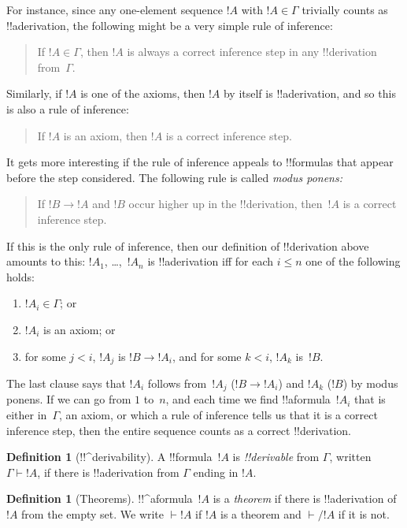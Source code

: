 \documentclass[10pt,a4paper]{article}
\theoremstyle{plain}
\theoremstyle{definition}
\newtheorem{defn}[thm]{Definition}
\theoremstyle{remark}
\providecommand{\lif}{\mathbin{\rightarrow}}
\providecommand{\Proves}{\mathrel{\vdash}}
\begin{document}
For instance, since any one-element sequence $!A$ with $!A \in \Gamma$
trivially counts as !!a{derivation}, the following might be a very
simple rule of inference:
\begin{quote}
  If $!A \in \Gamma$, then $!A$ is always a correct inference step in
  any !!{derivation} from~$\Gamma$.
\end{quote}
Similarly, if $!A$ is one of the axioms, then $!A$ by itself is
!!a{derivation}, and so this is also a rule of inference:
\begin{quote}
  If $!A$ is an axiom, then $!A$ is a correct inference step.
\end{quote}
It gets more interesting if the rule of inference appeals to
!!{formula}s that appear before the step considered. The following
rule is called \emph{modus ponens:}
\begin{quote}
  If $!B \lif !A$ and $!B$ occur higher up in the !!{derivation},
  then~$!A$ is a correct inference step.
\end{quote}
If this is the only rule of inference, then our definition of
!!{derivation} above amounts to this: $!A_1$, \dots,~$!A_n$ is
!!a{derivation} iff for each $i \le n$ one of the following holds:
\begin{enumerate}
\item $!A_i \in \Gamma$; or
\item $!A_i$ is an axiom; or
\item for some $j < i$, $!A_j$ is $!B \lif !A_i$, and for some $k < i$,
  $!A_k$ is~$!B$.
\end{enumerate}
The last clause says that $!A_i$ follows from~$!A_j$ ($!B \lif !A_i$) and $!A_k$
($!B$) by modus ponens. If we can go from $1$ to~$n$, and
each time we find !!a{formula}~$!A_i$ that is either in~$\Gamma$, an
axiom, or which a rule of inference tells us that it is a correct
inference step, then the entire sequence counts as a correct
!!{derivation}.

\begin{defn}[!!^{derivability}]
A !!{formula}~$!A$ is \emph{!!{derivable}} from $\Gamma$, written
$\Gamma \Proves !A$, if there is !!a{derivation} from $\Gamma$ ending
in $!A$.
\end{defn}

\begin{defn}[Theorems]
!!^a{formula}~$!A$ is a \emph{theorem} if there is !!a{derivation}
of~$!A$ from the empty set.  We write $\Proves !A$ if $!A$ is a
theorem and $\Proves/ !A$ if it is not.
\end{defn}
\end{document}
